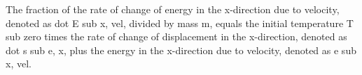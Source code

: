 The fraction of the rate of change of energy in the x-direction due to velocity, denoted as dot E sub x, vel, divided by mass m, equals the initial temperature T sub zero times the rate of change of displacement in the x-direction, denoted as dot s sub e, x, plus the energy in the x-direction due to velocity, denoted as e sub x, vel.